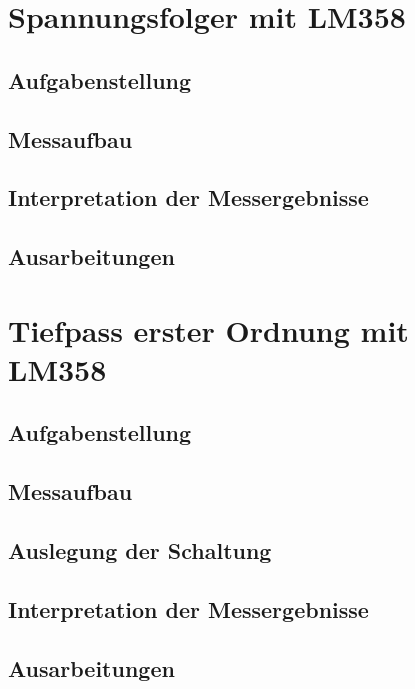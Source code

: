 \section{Spannungsfolger mit LM358}
\subsection{Aufgabenstellung}

\subsection{Messaufbau}


\subsection{Interpretation der Messergebnisse}

\subsection{Ausarbeitungen}

\section{Tiefpass erster Ordnung mit LM358}
\subsection{Aufgabenstellung}

\subsection{Messaufbau}

\subsection{Auslegung der Schaltung}

\subsection{Interpretation der Messergebnisse}

\subsection{Ausarbeitungen}

